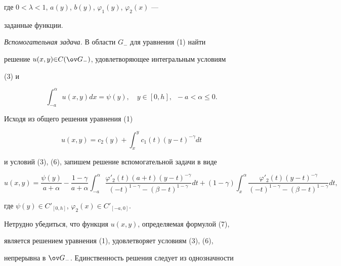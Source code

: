 где $0<\lambda<1$, $a(y)$, $b(y)$, $\varphi_1(y)$, $\varphi_2(x)$ --- 


заданные функции. 


\medskip 


 


{\it Вспомогательная задача.} В области $G_-$ для уравнения (1) найти 


решение $u(x,y){\in} C(\ov G_-)$, удовлетворяющее интегральным условиям 


(3) и 


\begin{equation} 


\int^\alpha_{-a}u(x,y)dx=\psi(y),\quad 


y\in[0,h],\ \; -a<\alpha\le0. 


\end{equation} 


 


Исходя из общего решения уравнения (1) 


$$ 


u(x,y)=c_2(y)+\int^y_x c_1(t)(y-t)^{-\gamma}dt 


$$ 


и условий (3), (6), запишем решение вспомогательной задачи в виде 


\begin{equation} 


u(x,y)=\frac{\psi(y)}{a+\alpha}-\frac{1-\gamma}{a+\alpha} 


\int^\alpha_{-a} 


\frac{\varphi'_2(t)(a+t)(y-t)^{-\gamma}} 


{(-t)^{1-\gamma}-(\beta-t)^{1-\gamma}}dt+ 


(1-\gamma)\int^\alpha_x 


\frac{\varphi'_2(t)(y-t)^{-\gamma}} 


{(-t)^{1-\gamma}-(\beta-t)^{1-\gamma}}dt, 


\end{equation} 


где $\psi(y)\in C'_{[0,h]}$, $\varphi_2(x)\in C'_{[-a,0]}$. 


 


Нетрудно убедиться, что функция $u(x,y)$, определяемая формулой (7), 


является решением уравнения (1), удовлетворяет условиям (3), (6), 


непрерывна в $\ov G_-$. Единственность решения следует из однозначности 


